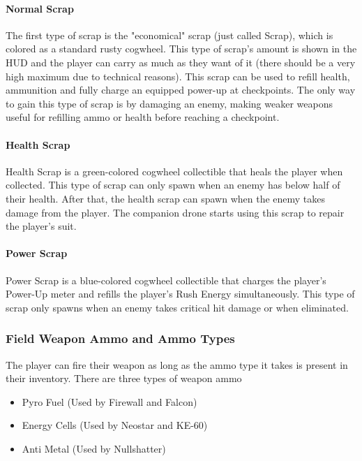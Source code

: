\documentclass[12pt]{article}
\begin{document}
\paragraph{Normal Scrap}

The first type of scrap is the "economical" scrap (just called Scrap), which is colored as a standard rusty cogwheel. This type of scrap's amount is shown in the HUD and the player can carry as much as they want of it (there should be a very high maximum due to technical reasons). This scrap can be used to refill health, ammunition and fully charge an equipped power-up at checkpoints. %
The only way to gain this type of scrap is by damaging an enemy, making weaker weapons useful for refilling ammo or health before reaching a checkpoint. 

\paragraph{Health Scrap}

Health Scrap is a green-colored cogwheel collectible that heals the player when collected. This type of scrap can only spawn when an enemy has below half of their health. After that, the health scrap can spawn when the enemy takes damage from the player. The companion drone starts using this scrap to repair the player's suit. 

\paragraph{Power Scrap}

Power Scrap is a blue-colored cogwheel collectible that charges the player's Power-Up meter and refills the player's Rush Energy simultaneously. This type of scrap only spawns when an enemy takes critical hit damage or when eliminated.

\subsubsection{Field Weapon Ammo and Ammo Types}

The player can fire their weapon as long as the ammo type it takes is present in their inventory. There are three types of weapon ammo

\begin{itemize}
	\item Pyro Fuel (Used by Firewall and Falcon)
	\item Energy Cells (Used by Neostar and KE-60)
	\item Anti Metal (Used by Nullshatter)
\end{itemize}
\end{document}
